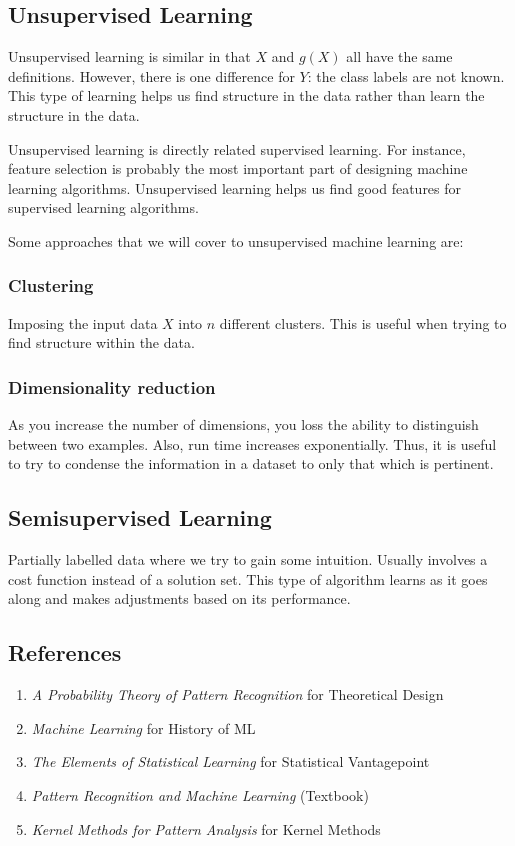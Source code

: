 \documentclass[12pt]{article}
\begin{document}
\subsection{Unsupervised Learning}

Unsupervised learning is similar in that $X$ and $g(X)$ all have the same definitions. However, there is one difference for $Y$: the class labels are not known. This type of learning helps us find structure in the data rather than learn the structure in the data. 

Unsupervised learning is directly related supervised learning. For instance, feature selection is probably the most important part of designing machine learning algorithms. Unsupervised learning helps us find good features for supervised learning algorithms. 

Some approaches that we will cover to unsupervised machine learning are:

\subsubsection{Clustering}

Imposing the input data $X$ into $n$ different clusters. This is useful when trying to find structure within the data.

\subsubsection{Dimensionality reduction}

As you increase the number of dimensions, you loss the ability to distinguish between two examples. Also, run time increases exponentially. Thus, it is useful to try to condense the information in a dataset to only that which is pertinent.

\subsection{Semisupervised Learning}

Partially labelled data where we try to gain some intuition. Usually involves a cost function instead of a solution set. This type of algorithm learns as it goes along and makes adjustments based on its performance.

\subsection{References}

\begin{enumerate}[noitemsep]
\item \textit{A Probability Theory of Pattern Recognition} for Theoretical Design
\item \textit{Machine Learning} for History of ML
\item \textit{The Elements of Statistical Learning} for Statistical Vantagepoint
\item \textit{Pattern Recognition and Machine Learning} (Textbook)
\item \textit{Kernel Methods for Pattern Analysis} for Kernel Methods
\end{enumerate}
\end{document}
